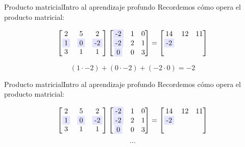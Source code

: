 \documentclass[10pt,border=3pt,tikz]{beamer}
\begin{document}
    \begin{frame}{Producto matricial}{Intro al aprendizaje profundo}
        Recordemos cómo opera el producto matricial:
        
        $$\begin{bmatrix}
            2 & 5 & 2\\
            \colorbox{blue!10}{1} & \colorbox{blue!10}{0} & \colorbox{blue!10}{-2}\\
            3 & 1 & 1
        \end{bmatrix}
        \begin{bmatrix}
            \colorbox{blue!10}{-2} & 1 & 0\\
            \colorbox{blue!10}{-2} & 2 & 1\\
            \colorbox{blue!10}{0} & 0 & 3
        \end{bmatrix} = 
        \begin{bmatrix}
            14 & 12 & 11\\
            \colorbox{blue!10}{-2} &  & \\
            &  & 
        \end{bmatrix}$$
        
        $$(1 \cdot -2) + (0 \cdot -2) + (-2 \cdot 0) = -2$$
    \end{frame}
    
    \begin{frame}{Producto matricial}{Intro al aprendizaje profundo}
        Recordemos cómo opera el producto matricial:
        
        $$\begin{bmatrix}
            2 & 5 & 2\\
            \colorbox{blue!10}{1} & \colorbox{blue!10}{0} & \colorbox{blue!10}{-2}\\
            3 & 1 & 1
        \end{bmatrix}
        \begin{bmatrix}
            \colorbox{blue!10}{-2} & 1 & 0\\
            \colorbox{blue!10}{-2} & 2 & 1\\
            \colorbox{blue!10}{0} & 0 & 3
        \end{bmatrix} = 
        \begin{bmatrix}
            14 & 12 & 11\\
            \colorbox{blue!10}{-2} &  & \\
            &  & 
        \end{bmatrix}$$
        
        $$\cdots$$
    \end{frame}
    
\end{document}
